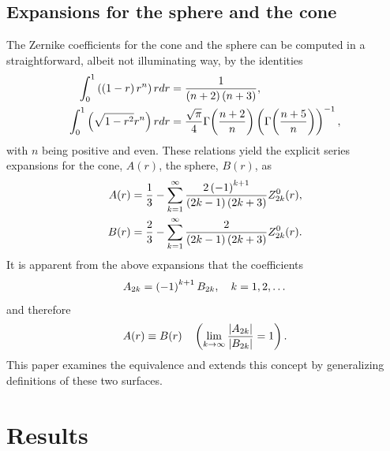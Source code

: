 \documentclass[preprint,12pt]{elsarticle}
\begin{document}
\subsection{Expansions for the sphere and the cone}
The Zernike coefficients for the cone and the sphere can be computed in a straightforward, albeit not illuminating way, by the identities
\begin{equation}
    \begin{split}
          \int_{0}^{1} \left( \left( 1-r \right)r^{n} \right)rdr 
      &= \frac{1}{\left( n+2 \right)\left( n+3 \right)}, \\
    \int_{0}^{1} \left( \sqrt{1-r^{2}} r^{n} \right)rdr 
      &= \frac{\sqrt{\pi}}{4} \Gamma{ \left( \frac{n+2}{n} \right) }  \left( \Gamma{ \left( \frac{n+5}{n} \right) } \right)^{-1},
    \end{split}
    \label{eq:monomial}
\end{equation}
with $n$ being positive and even. These relations yield the explicit series expansions for the cone, $A(r)$, the sphere, $B(r)$, as
  \begin{equation}
    \begin{split}
      A(r) &= \frac{1}{3} - \sum_{k=1}^{\infty} \frac{2\left( -1 \right)^{k+1}}{\left( 2k-1 \right) \left( 2k+3 \right)} Z_{2k}^{0}(r),\\
      B(r) &= \frac{2}{3} - \sum_{k=1}^{\infty} \frac{2}{\left( 2k-1 \right) \left( 2k+3 \right)} Z_{2k}^{0}(r).
    \end{split}
  \end{equation}
It is apparent from the above expansions that the coefficients
\begin{equation}
  A_{2k} = \left( -1 \right)^{k+1}B_{2k}, \quad k=1,2,\dots
\end{equation}
and therefore
\begin{equation}
  A(r) \equiv B(r) \quad \left( \lim_{k\to\infty} \frac{\left|A_{2k}\right|} {\left|B_{2k}\right|} = 1 \right).
\end{equation}
This paper examines the equivalence and extends this concept by generalizing definitions of these two surfaces.

\section{Results}
\label{sec:results}
\end{document}
